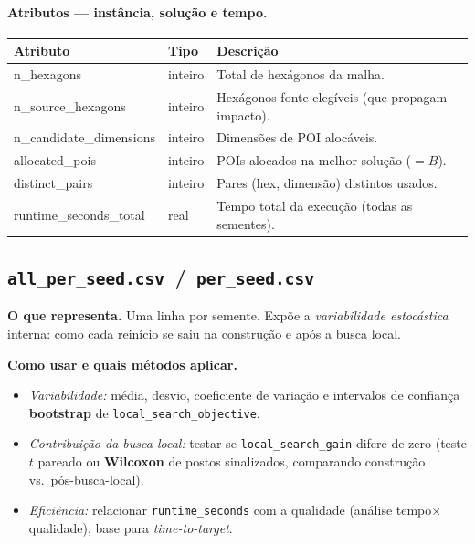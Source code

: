 \documentclass[11pt,a4paper]{article}
\begin{document}
\paragraph{Atributos --- instância, solução e tempo.}
\begin{center}\small
\begin{tabular}{@{}>{\ttfamily}l l p{8.0cm}@{}}
\toprule
\normalfont Atributo & \normalfont Tipo & \normalfont Descrição \\
\midrule
n\_hexagons        & inteiro & Total de hexágonos da malha. \\
n\_source\_hexagons& inteiro & Hexágonos-fonte elegíveis (que propagam impacto). \\
n\_candidate\_dimensions & inteiro & Dimensões de POI alocáveis. \\
allocated\_pois    & inteiro & POIs alocados na melhor solução ($=B$). \\
distinct\_pairs    & inteiro & Pares (hex, dimensão) distintos usados. \\
runtime\_seconds\_total & real & Tempo total da execução (todas as sementes). \\
\bottomrule
\end{tabular}
\end{center}

\subsection{\texttt{all\_per\_seed.csv} \,/\, \texttt{per\_seed.csv}}

\textbf{O que representa.} Uma linha por semente. Expõe a \emph{variabilidade
estocástica} interna: como cada reinício se saiu na construção e após a busca
local.

\textbf{Como usar e quais métodos aplicar.}
\begin{itemize}\setlength\itemsep{1pt}
\item \emph{Variabilidade:} média, desvio, coeficiente de variação e intervalos de
confiança \textbf{bootstrap} de \texttt{local\_search\_objective}.
\item \emph{Contribuição da busca local:} testar se \texttt{local\_search\_gain}
difere de zero (teste $t$ pareado ou \textbf{Wilcoxon} de postos sinalizados,
comparando construção vs.\ pós-busca-local).
\item \emph{Eficiência:} relacionar \texttt{runtime\_seconds} com a qualidade
(análise tempo$\times$qualidade), base para \emph{time-to-target}.
\end{itemize}
\end{document}
